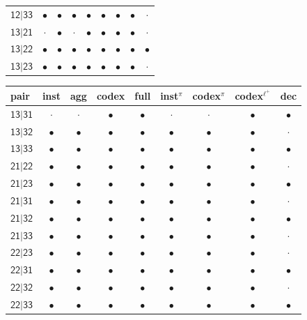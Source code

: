 \documentclass[11pt,a4paper]{article}
\theoremstyle{plain}
\theoremstyle{definition}
\theoremstyle{remark}
\newcommand{\st}[1]{\mathsf{#1}}
\newcommand{\priv}{\pi}
\newcommand{\opt}{\ell^{+}}
\begin{document}
\begin{table}[H]
\begin{tabular}{lcccccccc}
$\st{12|33}$ & $\bullet$ & $\bullet$ & $\bullet$ & $\bullet$ & $\bullet$ & $\bullet$ & $\bullet$ & $\cdot$ \\
$\st{13|21}$ & $\cdot$ & $\bullet$ & $\cdot$ & $\bullet$ & $\bullet$ & $\bullet$ & $\bullet$ & $\cdot$ \\
$\st{13|22}$ & $\bullet$ & $\bullet$ & $\bullet$ & $\bullet$ & $\bullet$ & $\bullet$ & $\bullet$ & $\bullet$ \\
$\st{13|23}$ & $\bullet$ & $\bullet$ & $\bullet$ & $\bullet$ & $\bullet$ & $\bullet$ & $\bullet$ & $\cdot$ \\
\bottomrule
\end{tabular}\quad
\begin{tabular}{lcccccccc}
\toprule
pair & inst & agg & codex & full & inst$^{\priv}$ & codex$^{\priv}$ & codex$^{\opt}$ & dec \\
\midrule
$\st{13|31}$ & $\cdot$ & $\cdot$ & $\bullet$ & $\bullet$ & $\cdot$ & $\cdot$ & $\bullet$ & $\bullet$ \\
$\st{13|32}$ & $\bullet$ & $\bullet$ & $\bullet$ & $\bullet$ & $\bullet$ & $\bullet$ & $\bullet$ & $\cdot$ \\
$\st{13|33}$ & $\bullet$ & $\bullet$ & $\bullet$ & $\bullet$ & $\bullet$ & $\bullet$ & $\bullet$ & $\bullet$ \\
$\st{21|22}$ & $\bullet$ & $\bullet$ & $\bullet$ & $\bullet$ & $\bullet$ & $\bullet$ & $\bullet$ & $\cdot$ \\
$\st{21|23}$ & $\bullet$ & $\bullet$ & $\bullet$ & $\bullet$ & $\bullet$ & $\bullet$ & $\bullet$ & $\bullet$ \\
$\st{21|31}$ & $\bullet$ & $\bullet$ & $\bullet$ & $\bullet$ & $\bullet$ & $\bullet$ & $\bullet$ & $\cdot$ \\
$\st{21|32}$ & $\bullet$ & $\bullet$ & $\bullet$ & $\bullet$ & $\bullet$ & $\bullet$ & $\bullet$ & $\bullet$ \\
$\st{21|33}$ & $\bullet$ & $\bullet$ & $\bullet$ & $\bullet$ & $\bullet$ & $\bullet$ & $\bullet$ & $\cdot$ \\
$\st{22|23}$ & $\bullet$ & $\bullet$ & $\bullet$ & $\bullet$ & $\bullet$ & $\bullet$ & $\bullet$ & $\cdot$ \\
$\st{22|31}$ & $\bullet$ & $\bullet$ & $\bullet$ & $\bullet$ & $\bullet$ & $\bullet$ & $\bullet$ & $\bullet$ \\
$\st{22|32}$ & $\bullet$ & $\bullet$ & $\bullet$ & $\bullet$ & $\bullet$ & $\bullet$ & $\bullet$ & $\cdot$ \\
$\st{22|33}$ & $\bullet$ & $\bullet$ & $\bullet$ & $\bullet$ & $\bullet$ & $\bullet$ & $\bullet$ & $\bullet$ \\

\end{tabular}
\end{table}
\end{document}
